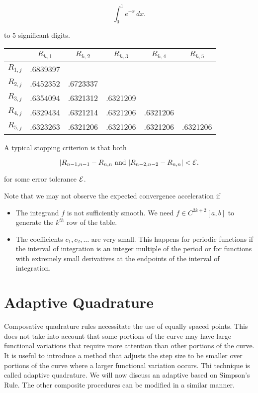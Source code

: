 \[
  \int_{0}^{1} e^{-x} \, dx
.\]

to $5$ significant digits.

\begin{tabular}{c|ccccc}
      & $R_{h,1}$ & $R_{h,2}$ & $R_{h,3}$ & $R_{h,4}$ & $R_{h,5}$ \\
\hline
  $R_{1,j}$ & .6839397 &          &          &        &            \\
  $R_{2,j}$ & .6452352 & .6723337 &          &        &            \\
  $R_{3,j}$ & .6354094 & .6321312 & .6321209 &        &            \\
  $R_{4,j}$ & .6329434 & .6321214 & .6321206 & .6321206 &          \\
  $R_{5,j}$ & .6323263 & .6321206 & .6321206 & .6321206 & .6321206 \\
\end{tabular}

A typical stopping criterion is that both

\[
  |R_{n-1, n-1} - R_{n,n} \text{ and } |R_{n-2,n-2} - R_{n,n}| < \mathcal{E}
.\]

for some error tolerance $\mathcal{E}$.

Note that we may not observe the expected convergence acceleration if

\begin{itemize}
  \item The integrand $f$ is not sufficiently smooth. We need $f\in
    C^{2k+2}[a,b]$ to generate the $k^{th}$ row of the table.
  \item The coefficients $c_1, c_2, \dots$ are very small. This happens for
    periodic functions if the interval of integration is an integer multiple of
    the period or for functions with extremely small derivatives at the
    endpoints of the interval of integration.
\end{itemize}

\section{Adaptive Quadrature}

Composative quadrature rules necessitate the use of equally spaced points. This
does not take into account that some portions of the curve may have large
functional variations that require more attention than other portions of the
curve. It is useful to introduce a method that adjusts the step size to be
smaller over portions of the curve where a larger functional variation occurs.
Thi technique is called adaptive quadrature. We will now discuss an adaptive
based on Simpson's Rule. The other composite procedures can be modified in a
similar manner.

